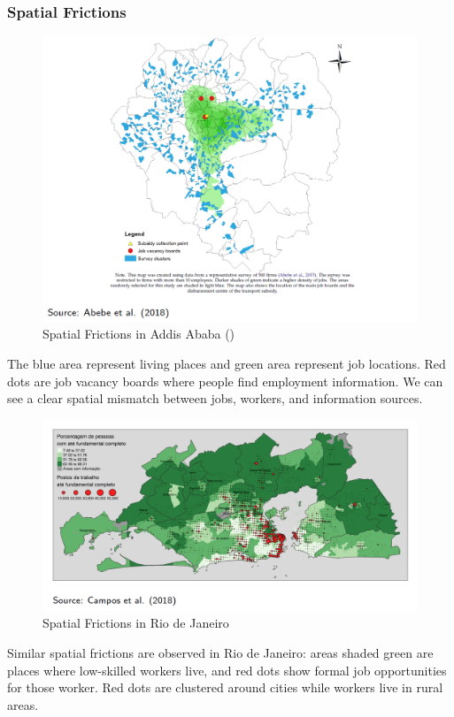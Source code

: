     \subsubsection{Spatial Frictions}
        \begin{figure}[H]
                \centering
                \includegraphics[width=5in]{images/ch6/spatial friction addis ababa.png}
                \caption{Spatial Frictions in Addis Ababa (\cite{abebe_anonymity_2021})}
                \label{fig:addis ababa spatial frictions}
        \end{figure}
        The blue area represent living places and green area represent job locations. Red dots are job vacancy boards where people find employment information. We can see a clear spatial mismatch between jobs, workers, and information sources.
        \begin{figure}[H]
                \centering
                \includegraphics[width=5in]{images/ch6/spatial friction rio de janeiro.png}
                \caption{Spatial Frictions in Rio de Janeiro}
        \end{figure}
        Similar spatial frictions are observed in Rio de Janeiro: areas shaded green are places where low-skilled workers live, and red dots show formal job opportunities for those worker. Red dots are clustered around cities while workers live in rural areas.
        
